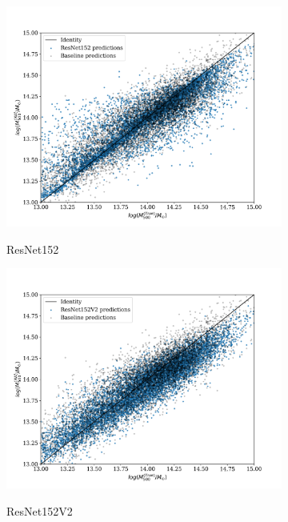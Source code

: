 \begin{figure}[H]
\begin{subfigure}{.325\textwidth}
    \includegraphics[width=\linewidth]{images/Chapter4/Results/training_ResNet152_scatter.png}
    \label{fig:training_ResNet152_scatter}
    \caption{ResNet152}
\end{subfigure}
\begin{subfigure}{.325\textwidth}
    \centering
    \includegraphics[width=\linewidth]{images/Chapter4/Results/training_ResNet152V2_scatter.png}
    \label{fig:training_ResNet152V2_scatter}
    \caption{ResNet152V2}
\end{subfigure}
\begin{subfigure}{.325\textwidth}
    \centering

\end{subfigure}
\end{figure}

